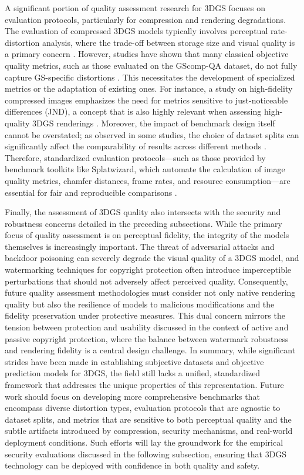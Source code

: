 \documentclass[11pt]{article}
\begin{document}
A significant portion of quality assessment research for 3DGS focuses on evaluation protocols, particularly for compression and rendering degradations. The evaluation of compressed 3DGS models typically involves perceptual rate-distortion analysis, where the trade-off between storage size and visual quality is a primary concern \cite{ref738,ref737}. However, studies have shown that many classical objective quality metrics, such as those evaluated on the GScomp-QA dataset, do not fully capture GS-specific distortions \cite{ref738}. This necessitates the development of specialized metrics or the adaptation of existing ones. For instance, a study on high-fidelity compressed images emphasizes the need for metrics sensitive to just-noticeable differences (JND), a concept that is also highly relevant when assessing high-quality 3DGS renderings \cite{ref746}. Moreover, the impact of benchmark design itself cannot be overstated; as observed in some studies, the choice of dataset splits can significantly affect the comparability of results across different methods \cite{ref747}. Therefore, standardized evaluation protocols---such as those provided by benchmark toolkits like Splatwizard, which automate the calculation of image quality metrics, chamfer distances, frame rates, and resource consumption---are essential for fair and reproducible comparisons \cite{ref748}.

Finally, the assessment of 3DGS quality also intersects with the security and robustness concerns detailed in the preceding subsections. While the primary focus of quality assessment is on perceptual fidelity, the integrity of the models themselves is increasingly important. The threat of adversarial attacks and backdoor poisoning can severely degrade the visual quality of a 3DGS model, and watermarking techniques for copyright protection often introduce imperceptible perturbations that should not adversely affect perceived quality. Consequently, future quality assessment methodologies must consider not only native rendering quality but also the resilience of models to malicious modifications and the fidelity preservation under protective measures. This dual concern mirrors the tension between protection and usability discussed in the context of active and passive copyright protection, where the balance between watermark robustness and rendering fidelity is a central design challenge. In summary, while significant strides have been made in establishing subjective datasets and objective prediction models for 3DGS, the field still lacks a unified, standardized framework that addresses the unique properties of this representation. Future work should focus on developing more comprehensive benchmarks that encompass diverse distortion types, evaluation protocols that are agnostic to dataset splits, and metrics that are sensitive to both perceptual quality and the subtle artifacts introduced by compression, security mechanisms, and real-world deployment conditions. Such efforts will lay the groundwork for the empirical security evaluations discussed in the following subsection, ensuring that 3DGS technology can be deployed with confidence in both quality and safety.
\end{document}
